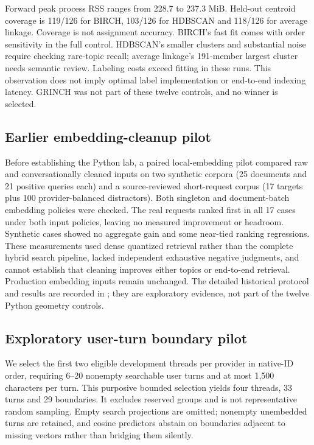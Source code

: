 \documentclass[11pt]{article}
\begin{document}
Forward peak process RSS ranges from 228.7 to 237.3 MiB. Held-out centroid
coverage is 119/126 for BIRCH, 103/126 for HDBSCAN and 118/126 for average linkage.
Coverage is not assignment accuracy. BIRCH's fast fit comes with order sensitivity
in the full control. HDBSCAN's smaller clusters and substantial noise require
checking rare-topic recall; average linkage's 191-member largest cluster needs
semantic review. Labeling costs exceed fitting in these runs. This observation
does not imply optimal label implementation or end-to-end indexing latency.
GRINCH was not part of these twelve controls, and no winner is selected.

\subsection{Earlier embedding-cleanup pilot}
Before establishing the Python lab, a paired local-embedding pilot compared raw
and conversationally cleaned inputs on two synthetic corpora (25 documents and
21 positive queries each) and a source-reviewed short-request corpus (17 targets
plus 100 provider-balanced distractors). Both singleton and document-batch
embedding policies were checked. The real requests ranked first in all 17 cases
under both input policies, leaving no measured improvement or headroom. Synthetic
cases showed no aggregate gain and some near-tied ranking regressions. These
measurements used dense quantized retrieval rather than the complete hybrid
search pipeline, lacked independent exhaustive negative judgments, and cannot
establish that cleaning improves either topics or end-to-end retrieval.
Production embedding inputs remain unchanged. The detailed historical protocol
and results are recorded in
; they are exploratory evidence,
not part of the twelve Python geometry controls.

\subsection{Exploratory user-turn boundary pilot}
We select the first two eligible development threads per provider in native-ID
order, requiring 6--20 nonempty searchable user turns and at most 1,500 characters
per turn. This purposive bounded selection yields four threads, 33 turns and
29 boundaries. It excludes reserved groups and is not representative random
sampling. Empty search projections are omitted; nonempty unembedded turns are
retained, and cosine predictors abstain on boundaries adjacent to missing
vectors rather than bridging them silently.
\end{document}
